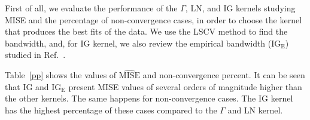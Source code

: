 \documentclass[twocolumn]{svjour3}
\begin{document}
	First of all, we evaluate the performance of the $\Gamma$, LN, and IG kernels studying MISE and the percentage of non-convergence cases, in order to choose the kernel that produces the best fits of the data. 
	We use the LSCV method to find the bandwidth, and, for IG kernel, we also review the empirical bandwidth ($\text{IG}_{\text{E}}$) studied in Ref.~\cite{gambini2015}. 
	
	Table~\ref{pp} shows the values of $\widehat{\text{MISE}}$ and non-convergence percent. 
	It can be seen that IG and $\text{IG}_{\text{E}}$ present MISE values of several orders of magnitude higher than the other kernels. 
	The same happens for non-convergence cases. 
	The IG kernel has the highest percentage of these cases compared to the $\Gamma$ and LN kernel.
	
\end{document}
